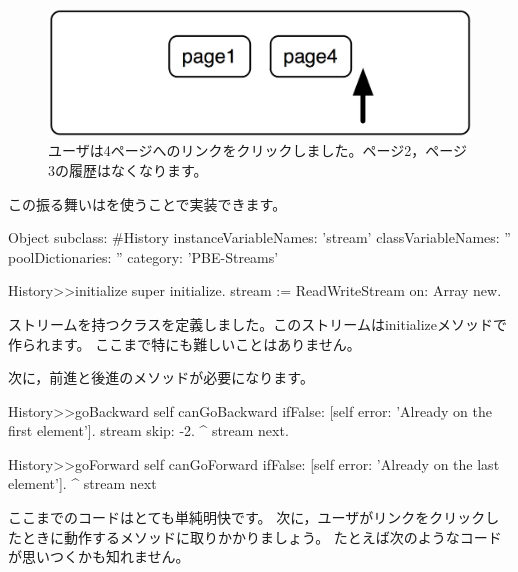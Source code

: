 \documentclass[a4paper,10pt,twoside]{book}
\begin{document}
{\begin{figure}[!ht]
\centerline{\includegraphics[scale=0.5]{page4Stef}}
\caption{ユーザは4ページへのリンクをクリックしました。ページ2，ページ3の履歴はなくなります。}
\vspace{.2in}
\end{figure}

この振る舞いはを使うことで実装できます。

\begin{code}{}
Object subclass: #History
  instanceVariableNames: 'stream'
  classVariableNames: ''
  poolDictionaries: ''
  category: 'PBE-Streams'

History>>initialize
    super initialize.
    stream := ReadWriteStream on: Array new.
\end{code}

ストリームを持つクラスを定義しました。このストリームはinitializeメソッドで作られます。
ここまで特にも難しいことはありません。

次に，前進と後進のメソッドが必要になります。

\begin{code}{}
History>>goBackward
  self canGoBackward ifFalse: [self error: 'Already on the first element'].
  stream skip: -2.
  ^ stream next.

History>>goForward
  self canGoForward ifFalse: [self error: 'Already on the last element'].
  ^ stream next
\end{code}

ここまでのコードはとても単純明快です。
次に，ユーザがリンクをクリックしたときに動作するメソッドに取りかかりましょう。
たとえば次のようなコードが思いつくかも知れません。

}
\end{document}
